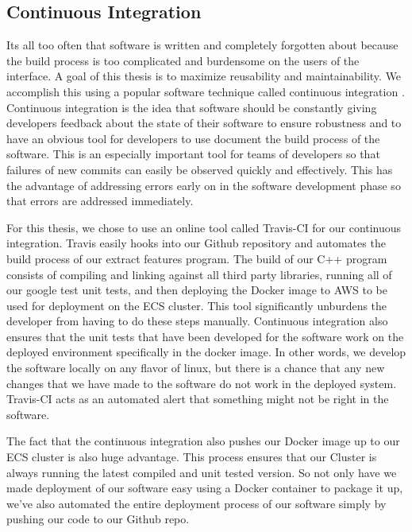 \subsection{\label{subsection:cont_integration}Continuous Integration}
Its all too often that software is written and completely forgotten about
because the build process is too complicated and burdensome on the users of the
interface.  A goal of this thesis is to maximize reusability and maintainability. We
accomplish this using a popular software technique called continuous
integration \cite{duvall2007continuous}. Continuous integration is the idea that
software should be constantly giving developers feedback about the state of
their software to ensure robustness and to have an obvious tool for developers
to use document the build process of the software. This is an especially
important tool for teams of developers so that failures of new commits
can easily be observed quickly and effectively. This has the advantage of addressing
errors early on in the software development phase so that errors are addressed
immediately.

For this thesis, we chose to use an online tool called Travis-CI for our
continuous integration. Travis easily hooks into our Github repository and
automates the build process of our extract features program. The build of our
C++ program consists of compiling and linking against all third party libraries,
running all of our google test unit tests, and then deploying the Docker image
to AWS to be used for deployment on the ECS cluster. This tool significantly
unburdens the developer from having to do these steps manually. Continuous
integration also ensures that the unit tests that have been developed for the
software work on the deployed environment specifically in the docker image. In
other words, we develop the software locally on any flavor of linux,  but there
is a chance that any new changes that we have made to the software do not work
in the deployed system. Travis-CI acts as an automated alert that something might
not be right in the software.

The fact that the continuous integration also pushes our Docker image up to  our
ECS cluster is also huge advantage. This process  ensures that  our Cluster is
always running the latest compiled and unit tested version.  So not only have we
made deployment of our software easy using a Docker  container to package it up,
we've also automated the entire deployment process of our software simply by
pushing our code to our Github repo.

